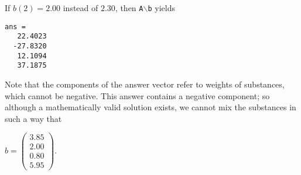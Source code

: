 \documentclass{ximera}
\begin{document}
\begin{exercise}
\begin{solution}
\para If $b(2) = 2.00$ instead of $2.30$, then
{\tt A}$\backslash${\tt b} yields

\begin{verbatim}
ans =
   22.4023
  -27.8320
   12.1094
   37.1875
\end{verbatim}
Note that the components of the answer vector refer to weights of
substances, which cannot be negative.  This answer contains a negative
component; so although a mathematically valid solution exists, we
cannot mix the substances in such a way that

$b = \left(\begin{array}{r} 3.85 \\ 2.00 \\ 0.80 \\ 5.95\end{array} \right)$.


\end{solution}
\end{exercise}
\end{document}
